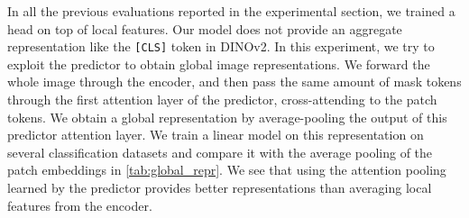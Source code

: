 In all the previous evaluations reported in the experimental section, we trained a head on top of local features.
Our model does not provide an aggregate representation like the \texttt{[CLS]} token in DINOv2.
In this experiment, we try to exploit the predictor to obtain global image representations.
We forward the whole image through the encoder, and then pass the same amount of mask tokens through the first attention layer of the predictor, cross-attending to the patch tokens.
We obtain a global representation by average-pooling the output of this predictor attention layer.
We train a linear model on this representation on several classification datasets and compare it with the average pooling of the patch embeddings in \cref{tab:global_repr}.
We see that using the attention pooling learned by the predictor provides better representations than averaging local features from the encoder.
